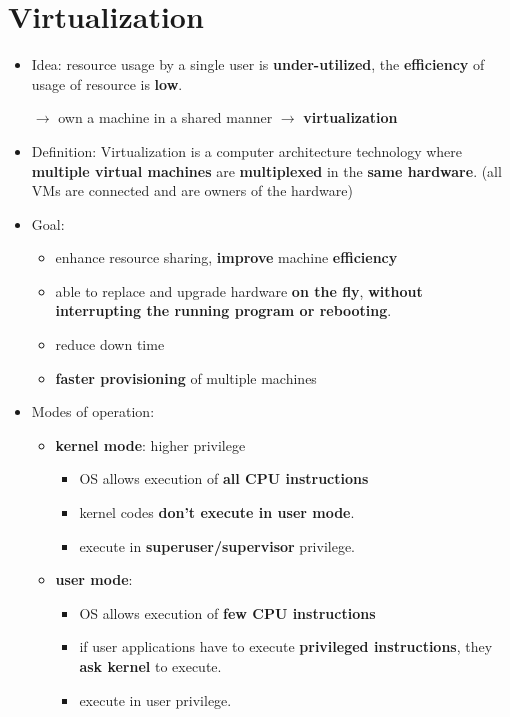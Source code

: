 \section{Virtualization}
\begin{itemize}
	\item Idea: resource usage by a single user is \textbf{under-utilized}, the \textbf{efficiency} of usage of resource is \textbf{low}.
	
	$\rightarrow$ own a machine in a shared manner $\rightarrow$ \textbf{virtualization}
	\item Definition: Virtualization is a computer architecture technology where \textbf{multiple virtual machines} are \textbf{multiplexed} in the \textbf{same hardware}. (all VMs are connected and are owners of the hardware)
	\item Goal:
	\begin{itemize}
		\item enhance resource sharing, \textbf{improve} machine \textbf{efficiency}
		\item able to replace and upgrade hardware \textbf{on the fly}, \textbf{without interrupting the running program or rebooting}.
		\item reduce down time
		\item \textbf{faster provisioning} of multiple machines 
	\end{itemize}
	\item Modes of operation:
	\begin{itemize}
		\item \textbf{kernel mode}: higher privilege
		\begin{itemize}
			\item OS allows execution of \textbf{all CPU instructions}
			\item kernel codes \textbf{don't execute in user mode}.
			\item execute in \textbf{superuser/supervisor} privilege. 
		\end{itemize}
		
		\item \textbf{user mode}:
		\begin{itemize}
			\item OS allows execution of \textbf{few CPU instructions}
			\item if user applications have to execute \textbf{privileged instructions}, they \textbf{ask kernel} to execute. 
			\item execute in user privilege.
		\end{itemize}
	\end{itemize}
\end{itemize}

